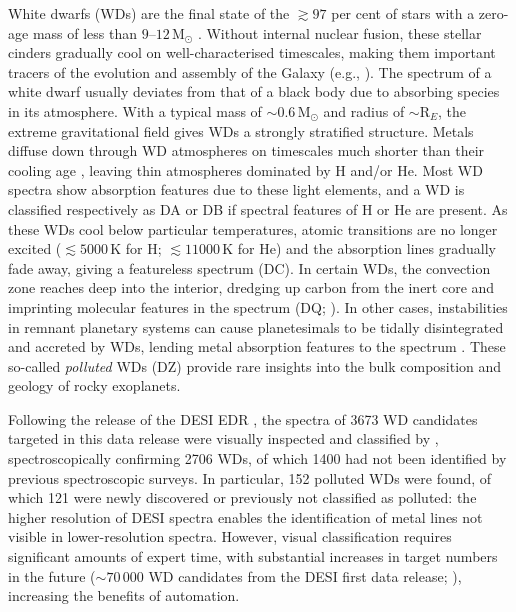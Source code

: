 \documentclass[fleqn,usenatbib]{mnras}
\begin{document}
White dwarfs (WDs) are the final state of the $\gtrsim97$ per cent of stars with a zero-age mass of less than $9$--$12\,\mathrm{M}_\odot$ \citep{lauffer18, althaus10, althaus21}.
Without internal nuclear fusion, these stellar cinders gradually cool on well-characterised timescales, making them important tracers of the evolution and assembly of the Galaxy (e.g., \citealt{winget87, tremblay14}).
The spectrum of a white dwarf usually deviates from that of a black body due to absorbing species in its atmosphere.
With a typical mass of $\sim0.6\,\mathrm{M}_\odot$ and radius of $\sim \mathrm{R}_E$, the extreme gravitational field gives WDs a strongly stratified structure.
Metals diffuse down through WD atmospheres on timescales much shorter than their cooling age \citep{schatzman45, paquette86, koester09, wyatt14}, leaving thin atmospheres dominated by H and/or He.
Most WD spectra show absorption features due to these light elements, and a WD is classified respectively as DA or DB if spectral features of H or He are present.
As these WDs cool below particular temperatures, atomic transitions are no longer excited ($\lesssim5000\,\text{K}$ for H; $\lesssim 11000\,\text{K}$ for He) and the absorption lines gradually fade away, giving a featureless spectrum (DC).
In certain WDs, the convection zone reaches deep into the interior, dredging up carbon from the inert core and imprinting molecular  features in the spectrum (DQ; \citealt{fontaine84, koester82, koester20, blouin23}).
In other cases, instabilities in remnant planetary systems can cause planetesimals to be tidally disintegrated and accreted by WDs, lending metal absorption features to the spectrum \citep{bonsor11, frewen14, mustill18, maldonado20}.
These so-called \textit{polluted} WDs (DZ) provide rare insights into the bulk composition and geology of rocky exoplanets.

Following the release of the DESI EDR \citep{desiedr}, the spectra of 3673 WD candidates targeted in this data release were visually inspected and classified by \citet{manser24}, spectroscopically confirming 2706 WDs, of which 1400 had not been identified by previous spectroscopic surveys.
In particular, 152 polluted WDs were found, of which 121 were newly discovered or previously not classified as polluted: the higher resolution of DESI spectra enables the identification of metal lines not visible in lower-resolution spectra.
However, visual classification requires significant amounts of expert time, with substantial increases in target numbers in the future ($\sim70\,000$ WD candidates from the DESI first data release; \citealt{cooper23}), increasing the benefits of automation. 
\end{document}

